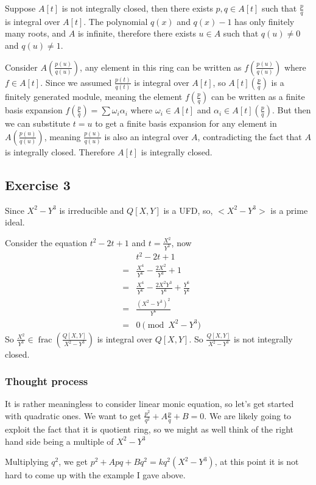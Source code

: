 \documentclass{article}
\DeclareMathOperator{\fractionfield}{frac}
\begin{document}
Suppose $ A[t] $ is not integrally closed, then there exists $ p, q \in A[t] $ such that $ \frac{p}{q} $ is integral over $ A[t] $. The polynomial $ q(x) $ and $ q(x) - 1 $ has only finitely many roots, and $ A $ is infinite, therefore there exists $ u \in A $ such that $ q(u) \ne 0 $ and $ q(u) \ne 1 $. 

Consider $ A\left(\frac{p(u)}{q(u)}\right) $, any element in this ring can be written as $ f\left(\frac{p(u)}{q(u)}\right) $ where $ f \in A[t] $. Since we assumed $ \frac{p(t)}{q(t)} $ is integral over $ A[t] $, so $ A[t]\left(\frac{p}{q}\right) $ is a finitely generated module, meaning the element $ f\left(\frac{p}{q}\right) $ can be written as a finite basis expansion $ f\left(\frac{p}{q}\right) = \sum \omega_i \alpha_i $ where $ \omega_i \in A[t] $ and $ \alpha_i \in A[t]\left(\frac{p}{q}\right) $. But then we can substitute $ t = u $ to get a finite basis expansion for any element in $ A\left(\frac{p(u)}{q(u)}\right) $, meaning $ \frac{p(u)}{q(u)} $ is also an integral over $ A $, contradicting the fact that $ A $ is integrally closed. Therefore $ A[t] $ is integrally closed.

\subsection{Exercise 3}
Since $ X^2 - Y^3 $ is irreducible and $ Q[X, Y] $ is a UFD, so, $ <X^2 - Y^3> $ is a prime ideal.

Consider the equation $ t^2 - 2t + 1 $ and $ t = \frac{X^2}{Y^3} $, now 
\begin{eqnarray*}
  & & t^2 - 2t + 1 \\
  &=& \frac{X^4}{Y^6} - \frac{2X^2}{Y^3} + 1 \\
  &=& \frac{X^4}{Y^6} - \frac{2X^2Y^3}{Y^6} + \frac{Y^6}{Y^6} \\
  &=& \frac{(X^2 - Y^3)^2}{Y^6}  \\
  &=& 0 \pmod{X^2 - Y^3} 
\end{eqnarray*}
So $ \frac{X^2}{Y^3} \in \fractionfield(\frac{Q[X,Y]}{X^2 - Y^3}) $ is integral over $ Q[X,Y] $. So $ \frac{Q[X,Y]}{X^2 - Y^3} $ is not integrally closed.
\subsubsection{Thought process}
It is rather meaningless to consider linear monic equation, so let's get started with quadratic ones. We want to get
$ \frac{p^2}{q^2} + A\frac{p}{q} + B = 0 $. We are likely going to exploit the fact that it is quotient ring, so we might as well think of the right hand side being a multiple of $ X^2 - Y^3 $

Multiplying $ q^2 $, we get $ p^2 + Apq + Bq^2 = kq^2(X^2 - Y^3) $, at this point it is not hard to come up with the example I gave above.
\end{document}
